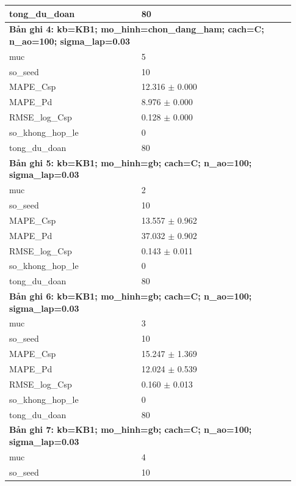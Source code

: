 \begin{longtable}{p{0.43\linewidth}p{0.50\linewidth}}
tong\_\allowbreak du\_\allowbreak doan & 80 \\
\midrule
\multicolumn{2}{p{0.95\linewidth}}{\textbf{Bản ghi 4: kb=KB1; mo\_hinh=chon\_dang\_ham; cach=C; n\_ao=100; sigma\_lap=0.03}} \\
muc & 5 \\
so\_\allowbreak seed & 10 \\
MAPE\_\allowbreak Csp & 12.316 $\pm$ 0.000 \\
MAPE\_\allowbreak Pd & 8.976 $\pm$ 0.000 \\
RMSE\_\allowbreak log\_\allowbreak Csp & 0.128 $\pm$ 0.000 \\
so\_\allowbreak khong\_\allowbreak hop\_\allowbreak le & 0 \\
tong\_\allowbreak du\_\allowbreak doan & 80 \\
\midrule
\multicolumn{2}{p{0.95\linewidth}}{\textbf{Bản ghi 5: kb=KB1; mo\_hinh=gb; cach=C; n\_ao=100; sigma\_lap=0.03}} \\
muc & 2 \\
so\_\allowbreak seed & 10 \\
MAPE\_\allowbreak Csp & 13.557 $\pm$ 0.962 \\
MAPE\_\allowbreak Pd & 37.032 $\pm$ 0.902 \\
RMSE\_\allowbreak log\_\allowbreak Csp & 0.143 $\pm$ 0.011 \\
so\_\allowbreak khong\_\allowbreak hop\_\allowbreak le & 0 \\
tong\_\allowbreak du\_\allowbreak doan & 80 \\
\midrule
\multicolumn{2}{p{0.95\linewidth}}{\textbf{Bản ghi 6: kb=KB1; mo\_hinh=gb; cach=C; n\_ao=100; sigma\_lap=0.03}} \\
muc & 3 \\
so\_\allowbreak seed & 10 \\
MAPE\_\allowbreak Csp & 15.247 $\pm$ 1.369 \\
MAPE\_\allowbreak Pd & 12.024 $\pm$ 0.539 \\
RMSE\_\allowbreak log\_\allowbreak Csp & 0.160 $\pm$ 0.013 \\
so\_\allowbreak khong\_\allowbreak hop\_\allowbreak le & 0 \\
tong\_\allowbreak du\_\allowbreak doan & 80 \\
\midrule
\multicolumn{2}{p{0.95\linewidth}}{\textbf{Bản ghi 7: kb=KB1; mo\_hinh=gb; cach=C; n\_ao=100; sigma\_lap=0.03}} \\
muc & 4 \\
so\_\allowbreak seed & 10 \\

\end{longtable}

